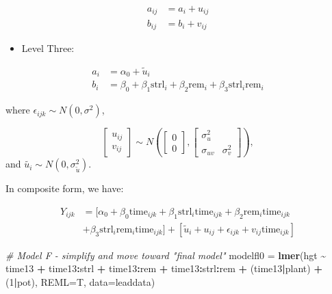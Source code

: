 \documentclass[
]{krantz}
\newenvironment{Shaded}{\begin{snugshade}}{\end{snugshade}}
\newcommand{\AttributeTok}[1]{\textcolor[rgb]{0.27,0.27,0.27}{#1}}
\newcommand{\CommentTok}[1]{\textcolor[rgb]{0.37,0.37,0.37}{\textit{#1}}}
\newcommand{\DecValTok}[1]{\textcolor[rgb]{0.06,0.06,0.06}{#1}}
\newcommand{\FunctionTok}[1]{\textcolor[rgb]{0.27,0.27,0.27}{\textbf{#1}}}
\newcommand{\NormalTok}[1]{#1}
\newcommand{\OtherTok}[1]{\textcolor[rgb]{0.37,0.37,0.37}{#1}}
\newcommand{\SpecialCharTok}[1]{\textcolor[rgb]{0.43,0.43,0.43}{\textbf{#1}}}
\providecommand{\tightlist}{%
  \setlength{\itemsep}{0pt}\setlength{\parskip}{0pt}}
\begin{document}
\begin{align*}
a_{ij} & = a_{i}+u_{ij} \\
b_{ij} & = b_{i}+v_{ij}
\end{align*}

\begin{itemize}
\tightlist
\item
  Level Three:
\end{itemize}

\begin{align*}
a_{i} & = \alpha_{0} + \tilde{u}_{i} \\
b_{i} & = \beta_{0}+\beta_{1}\textrm{strl}_{i}+\beta_{2}\textrm{rem}_{i} + \beta_{3}\textrm{strl}_{i}\textrm{rem}_{i}
\end{align*}

where \(\epsilon_{ijk}\sim N(0,\sigma^2)\),

\[ \left[ \begin{array}{c}
            u_{ij} \\ v_{ij}
          \end{array}  \right] \sim N \left( \left[
          \begin{array}{c}
            0 \\ 0
          \end{array} \right], \left[
          \begin{array}{cc}
            \sigma_{u}^{2} & \\
            \sigma_{uv} & \sigma_{v}^{2}
          \end{array} \right] \right), \]
and \(\tilde{{u}_{i}}\sim N(0,\sigma_{\tilde{u}}^{2})\).

In composite form, we have:

\begin{align*}
Y_{ijk} & = [\alpha_{0}+ \beta_{0}\textrm{time}_{ijk} + \beta_{1}\textrm{strl}_{i}\textrm{time}_{ijk} + \beta_{2}\textrm{rem}_{i}\textrm{time}_{ijk}  \\
 & + \beta_{3}\textrm{strl}_{i}\textrm{rem}_{i}\textrm{time}_{ijk}] + [\tilde{u}_{i}+u_{ij}+ \epsilon_{ijk}+ v_{ij}\textrm{time}_{ijk}]
\end{align*}

\begin{Shaded}
\begin{Highlighting}[]
\CommentTok{\# Model F {-} simplify and move toward "final model"}
\NormalTok{modelfl0 }\OtherTok{=} \FunctionTok{lmer}\NormalTok{(hgt }\SpecialCharTok{\textasciitilde{}}\NormalTok{ time13 }\SpecialCharTok{+}\NormalTok{ time13}\SpecialCharTok{:}\NormalTok{strl }\SpecialCharTok{+} 
\NormalTok{  time13}\SpecialCharTok{:}\NormalTok{rem }\SpecialCharTok{+}\NormalTok{ time13}\SpecialCharTok{:}\NormalTok{strl}\SpecialCharTok{:}\NormalTok{rem }\SpecialCharTok{+}
\NormalTok{  (time13}\SpecialCharTok{|}\NormalTok{plant) }\SpecialCharTok{+}\NormalTok{ (}\DecValTok{1}\SpecialCharTok{|}\NormalTok{pot), }\AttributeTok{REML=}\NormalTok{T, }\AttributeTok{data=}\NormalTok{leaddata)}
\end{Highlighting}
\end{Shaded}
\end{document}
